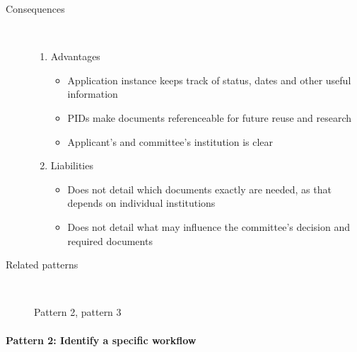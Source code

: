 \documentclass[10pt]{article}
\begin{document}
\begin{description}
	\item[Consequences]~\par
		\begin{enumerate}
			\item Advantages
			\begin{itemize}
				\item Application instance keeps track of status, dates and other useful information
				\item PIDs make documents referenceable for future reuse and research
				\item Applicant's and committee's institution is clear
			\end{itemize}
			\item Liabilities
			\begin{itemize}
				\item Does not detail which documents exactly are needed, as that depends on individual institutions
				\item Does not detail what may influence the committee’s decision and required documents

			\end{itemize}
		\end{enumerate}
		
		
	\item[Related patterns]~\par
		Pattern 2, pattern 3
\end{description}


\paragraph{Pattern 2: Identify a specific workflow}
\end{document}
